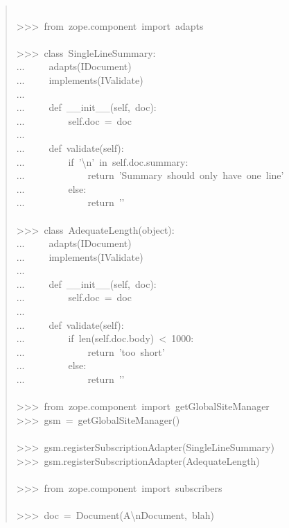 \documentclass[14pt,a4paper,openany,twoside,final]{extbook}
\begin{document}
\begin{quote}
{~\\
>{}>{}>~from~zope.component~import~adapts\\
~\\
>{}>{}>~class~SingleLineSummary:\\
...~~~~~adapts(IDocument)\\
...~~~~~implements(IValidate)\\
...\\
...~~~~~def~\_\_init\_\_(self,~doc):\\
...~~~~~~~~~self.doc~=~doc\\
...\\
...~~~~~def~validate(self):\\
...~~~~~~~~~if~'\textbackslash{}n'~in~self.doc.summary:\\
...~~~~~~~~~~~~~return~'Summary~should~only~have~one~line'\\
...~~~~~~~~~else:\\
...~~~~~~~~~~~~~return~'{}'\\
~\\
>{}>{}>~class~AdequateLength(object):\\
...~~~~~adapts(IDocument)\\
...~~~~~implements(IValidate)\\
...\\
...~~~~~def~\_\_init\_\_(self,~doc):\\
...~~~~~~~~~self.doc~=~doc\\
...\\
...~~~~~def~validate(self):\\
...~~~~~~~~~if~len(self.doc.body)~<~1000:\\
...~~~~~~~~~~~~~return~'too~short'\\
...~~~~~~~~~else:\\
...~~~~~~~~~~~~~return~'{}'\\
~\\
>{}>{}>~from~zope.component~import~getGlobalSiteManager\\
>{}>{}>~gsm~=~getGlobalSiteManager()\\
~\\
>{}>{}>~gsm.registerSubscriptionAdapter(SingleLineSummary)\\
>{}>{}>~gsm.registerSubscriptionAdapter(AdequateLength)\\
~\\
>{}>{}>~from~zope.component~import~subscribers\\
~\\
>{}>{}>~doc~=~Document(\textquotedbl{}A\textbackslash{}nDocument\textquotedbl{},~\textquotedbl{}blah\textquotedbl{})\\
}
\end{quote}
\end{document}
